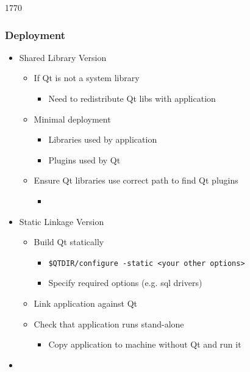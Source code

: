 \begin{slide}{1770}
  \frametitle{Deployment}
  \begin{itemize}
  \item Shared Library Version
    \begin{itemize}
    \item If Qt is not a system library
      \begin{itemize}
      \item Need to redistribute Qt libs with application
      \end{itemize}
    \item Minimal deployment
      \begin{itemize}
      \item Libraries used by application
      \item Plugins used by Qt
      \end{itemize}
    \item Ensure Qt libraries use correct path to find Qt plugins
      \begin{itemize}
      \item[] 
      \end{itemize}
   \end{itemize}
  \item Static Linkage Version
    \begin{itemize}
    \item Build Qt statically
      \begin{itemize}
      \item \texttt{\$QTDIR/configure -static <your other options>}
      \item Specify required options (e.g. sql drivers)
      \end{itemize}
    \item Link application against Qt
    \item Check that application runs stand-alone
      \begin{itemize}
      \item Copy application to machine without Qt and run it
      \end{itemize}
    \end{itemize}
  \item {}
  \end{itemize}

\end{slide}
